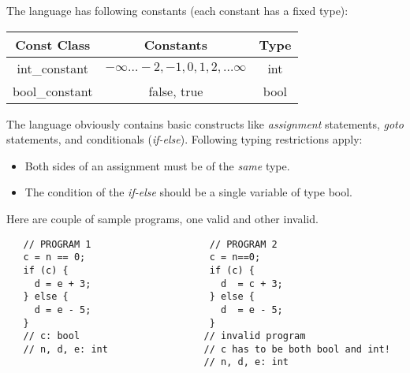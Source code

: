 \documentclass[12pt]{article}
\begin{document}
\begin{enumerate}
  The language has
  following constants (each constant has a fixed type):
  \begin{center}
    \begin{tabular}{|c|c|c|} \hline
      {\bf Const Class} & {\bf Constants} & {\bf Type} \\ \hline \hline
      int\_constant & $-\infty\ldots -2, -1, 0, 1, 2, \ldots
      \infty$ & int \\ \hline 
      bool\_constant & false, true & bool \\ \hline
    \end{tabular}
  \end{center}
 The language obviously contains basic constructs like
 {\em assignment} statements, {\em goto} statements, and conditionals
 ({\em if-else}). Following typing restrictions apply:
 \begin{itemize}
 \item Both sides of an assignment must be of the {\em same}
   type.
 \item The condition of the {\em if-else} should be a single
   variable of type bool.
 \end{itemize}
 Here are couple of sample programs, one valid and other invalid.
\begin{verbatim}
   // PROGRAM 1                     // PROGRAM 2
   c = n == 0;                      c = n==0;
   if (c) {                         if (c) {
     d = e + 3;                       d  = c + 3;
   } else {                         } else { 
     d = e - 5;                       d  = e - 5;
   }                                }
   // c: bool                      // invalid program
   // n, d, e: int                 // c has to be both bool and int! 
                                   // n, d, e: int
\end{verbatim}


\end{enumerate}
\end{document}
